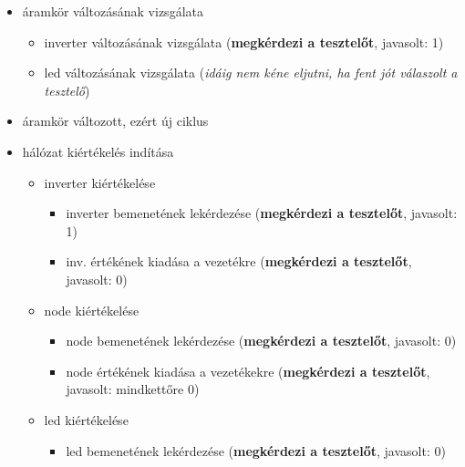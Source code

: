 {\begin{itemize}
\begin{itemize}
\begin{itemize}
	\begin{itemize}
	\setlength{\itemsep}{0cm}%
	\setlength{\parskip}{0cm}%
	\setlength{\itemindent}{-65pt}%
		\item led bemenetének lekérdezése (\textbf{megkérdezi a tesztelőt}, javasolt: 1)
	\end{itemize}
\end{itemize}
\item áramkör változásának vizsgálata
\begin{itemize}
\setlength{\itemsep}{0cm}%
\setlength{\parskip}{0cm}%
\setlength{\itemindent}{-50pt}%
	\item inverter változásának vizsgálata (\textbf{megkérdezi a tesztelőt}, javasolt: 1)
	\item led változásának vizsgálata (\textit{idáig nem kéne eljutni, ha fent jót válaszolt a tesztelő})
\end{itemize}
\item áramkör változott, ezért új ciklus
\item hálózat kiértékelés indítása
\begin{itemize}
\setlength{\itemsep}{0cm}%
\setlength{\parskip}{0cm}%
\setlength{\itemindent}{-50pt}%
	\item inverter kiértékelése
	\begin{itemize}
	\setlength{\itemsep}{0cm}%
	\setlength{\parskip}{0cm}%
	\setlength{\itemindent}{-65pt}%
		\item inverter bemenetének lekérdezése (\textbf{megkérdezi a tesztelőt}, javasolt: 1)
		\item inv. értékének kiadása a vezetékre (\textbf{megkérdezi a tesztelőt}, javasolt: 0)
	\end{itemize}
	\item node kiértékelése
	\begin{itemize}
	\setlength{\itemsep}{0cm}%
	\setlength{\parskip}{0cm}%
	\setlength{\itemindent}{-65pt}%
		\item node bemenetének lekérdezése (\textbf{megkérdezi a tesztelőt}, javasolt: 0)
		\item node értékének kiadása a vezetékekre (\textbf{megkérdezi a tesztelőt}, javasolt: mindkettőre 0)
	\end{itemize}
	\item led kiértékelése
	\begin{itemize}
	\setlength{\itemsep}{0cm}%
	\setlength{\parskip}{0cm}%
	\setlength{\itemindent}{-65pt}%
		\item led bemenetének lekérdezése (\textbf{megkérdezi a tesztelőt}, javasolt: 0)

\end{itemize}
\end{itemize}
\end{itemize}
\end{itemize}}
